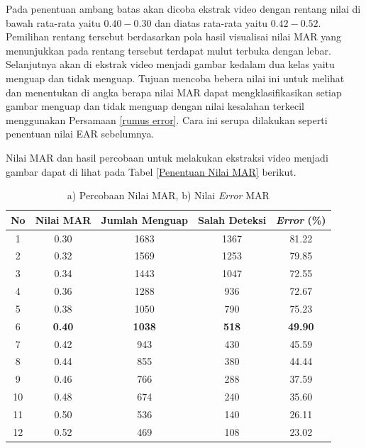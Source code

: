 \begin{table}[H]
            Pada penentuan ambang batas akan dicoba ekstrak video dengan rentang nilai di bawah rata-rata yaitu $0.40 - 0.30$ dan diatas rata-rata yaitu $0.42 - 0.52$. Pemilihan rentang tersebut berdasarkan pola hasil visualisai nilai MAR yang menunjukkan pada rentang tersebut terdapat mulut terbuka dengan lebar. Selanjutnya akan di ekstrak video menjadi gambar kedalam dua kelas yaitu menguap dan tidak menguap. Tujuan mencoba bebera nilai ini untuk 
            melihat dan menentukan di angka berapa nilai MAR dapat mengklasifikasikan setiap gambar menguap dan tidak menguap dengan nilai kesalahan terkecil menggunakan Persamaan \ref{rumus error}. Cara ini serupa dilakukan seperti penentuan nilai EAR sebelumnya.
            
            Nilai MAR dan hasil percobaan untuk melakukan ekstraksi video menjadi gambar dapat di lihat pada Tabel \ref{Penentuan Nilai MAR} berikut.\\


        
            \begin{table}[h]
            \centering
            \caption{a) Percobaan Nilai MAR, b) Nilai \textit{Error} MAR}
            \begin{tabular}{ccccc}
                \toprule
                \textbf{No} &\textbf{Nilai MAR} & \textbf{Jumlah Menguap} & \textbf{Salah Deteksi} & \textbf{\textit{Error} (\%)} \\
                \midrule
                          1 & 0.30 & 1683 & 1367 &  81.22 \\
                          2 & 0.32 & 1569 & 1253 & 79.85 \\
                          3 & 0.34 & 1443 & 1047 & 72.55 \\
                          4 & 0.36 & 1288 & 936  & 72.67 \\
                          5 & 0.38 & 1050 & 790  & 75.23\\
                         6 & \textbf{0.40} & \textbf{1038}& \textbf{518} &  \textbf{49.90} \\
                          7 & 0.42 & 943 & 430 & 45.59 \\
                          8 & 0.44 & 855 & 380 & 44.44 \\
                          9 & 0.46 & 766 & 288 & 37.59 \\
                          10 & 0.48 & 674 & 240 & 35.60 \\
                          11 & 0.50 & 536 & 140  & 26.11 \\
                          12 & 0.52 & 469 & 108 & 23.02 \\
                         

\end{tabular}
\end{table}
\end{table}
